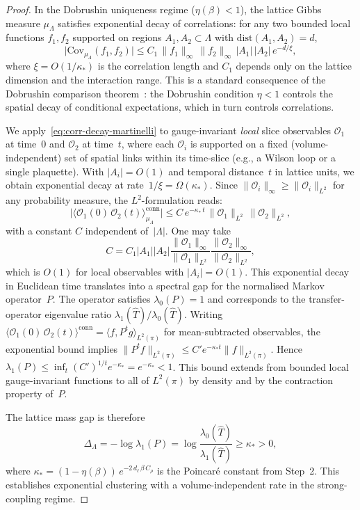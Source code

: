 \documentclass[12pt,a4paper]{article}
\theoremstyle{definition}
\theoremstyle{plain}
\theoremstyle{remark}
\begin{document}
\begin{proof}
In the Dobrushin uniqueness regime ($\eta(\beta) < 1$), the lattice Gibbs measure $\mu_\Lambda$ satisfies exponential decay of correlations: for any two bounded local functions $f_1, f_2$ supported on regions $A_1, A_2 \subset \Lambda$ with $\mathrm{dist}(A_1, A_2) = d$,
\begin{equation}\label{eq:corr-decay-martinelli}
    \bigl|\mathrm{Cov}_{\mu_\Lambda}(f_1, f_2)\bigr| \leq C_1\,\|f_1\|_\infty\,\|f_2\|_\infty\,|A_1|\,|A_2|\,e^{-d/\xi},
\end{equation}
where $\xi = O(1/\kappa_*)$ is the correlation length and $C_1$ depends only on the lattice dimension and the interaction range. This is a standard consequence of the Dobrushin comparison theorem~\cite{DobrushinShlosman1985, Martinelli1999, GuionnetZegarlinski2003}: the Dobrushin condition $\eta < 1$ controls the spatial decay of conditional expectations, which in turn controls correlations.

We apply~\eqref{eq:corr-decay-martinelli} to gauge-invariant \emph{local} slice observables $\mathcal{O}_1$ at time~$0$ and $\mathcal{O}_2$ at time~$t$, where each $\mathcal{O}_i$ is supported on a fixed (volume-independent) set of spatial links within its time-slice (e.g., a Wilson loop or a single plaquette). With $|A_i| = O(1)$ and temporal distance~$t$ in lattice units, we obtain exponential decay at rate~$1/\xi = \Omega(\kappa_*)$. Since $\|\mathcal{O}_i\|_\infty \geq \|\mathcal{O}_i\|_{L^2}$ for any probability measure, the $L^2$-formulation reads:
\[
    \bigl|\langle \mathcal{O}_1(0)\,\mathcal{O}_2(t)\rangle_{\mu_\Lambda}^{\mathrm{conn}}\bigr|
    \leq C\,e^{-\kappa_*\,t}\,\|\mathcal{O}_1\|_{L^2}\,\|\mathcal{O}_2\|_{L^2},
\]
with a constant $C$ independent of~$|\Lambda|$.
One may take
\[
  C =
  C_1 |A_1| |A_2|
  \frac{\|\mathcal{O}_1\|_\infty}{\|\mathcal{O}_1\|_{L^2}}
  \frac{\|\mathcal{O}_2\|_\infty}{\|\mathcal{O}_2\|_{L^2}},
\]
which is $O(1)$ for local observables with $|A_i| = O(1)$.
This exponential decay in Euclidean time translates into a spectral gap for
the normalised Markov operator~$P$. The operator satisfies
$\lambda_0(P) = 1$ and corresponds to the transfer-operator eigenvalue ratio
$\lambda_1(\hat{T})/\lambda_0(\hat{T})$.
Writing
$\langle \mathcal{O}_1(0)\,\mathcal{O}_2(t)\rangle^{\mathrm{conn}}
= \langle f, P^t g\rangle_{L^2(\pi)}$ for mean-subtracted observables,
the exponential bound implies
$\|P^t f\|_{L^2(\pi)} \leq C'e^{-\kappa_*t}\|f\|_{L^2(\pi)}$.
Hence $\lambda_1(P) \leq \inf_t (C')^{1/t}e^{-\kappa_*}
= e^{-\kappa_*} < 1$.
This bound extends from bounded local gauge-invariant functions to all of
$L^2(\pi)$ by density and by the contraction property of~$P$.

The lattice mass gap is therefore
\begin{equation}
    \Delta_\Lambda = -\log\lambda_1(P) = \log\frac{\lambda_0(\hat{T})}{\lambda_1(\hat{T})} \geq \kappa_* > 0,
\end{equation}
where $\kappa_* = (1 - \eta(\beta))\,e^{-2\,d_\ell\,\beta\,C_\rho}$ is the Poincar\'e constant from Step~2.
This establishes exponential clustering with a volume-independent rate in the strong-coupling regime.
\end{proof}
\end{document}
